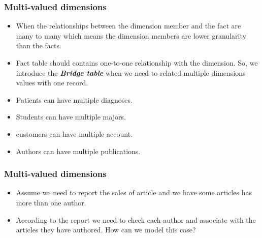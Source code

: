 \begin{frame}
\frametitle{Multi-valued dimensions}
\begin{itemize}[<+->]
	\item When the relationships between the dimension member and the fact are many to many which means the dimension members are lower granularity than the facts. 
	\item Fact table should contains one-to-one relationship with the dimension. So, we introduce the \textbf{\textit{Bridge table}} when we need to related multiple dimensions values with one record.
\end{itemize}

\begin{example}
	\begin{itemize}[<+->]
		\item Patients can have multiple diagnoses.
		\item Students can have multiple majors.
		\item customers can have multiple account.
		\item Authors can have multiple publications.
	\end{itemize}
\end{example}		

\end{frame}
\begin{frame}
	\frametitle{Multi-valued dimensions}
	\begin{example}
		\begin{itemize}[<+->]
			\item Assume we need to report the sales of article and we have some articles has more than one author.
			\item According to the report we need to check each author and associate with the articles they have authored. How can we model this case?
		\end{itemize}
	\end{example}

\end{frame}

